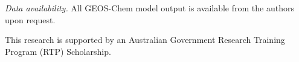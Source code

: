 \documentclass[acp, manuscript]{copernicus} %
\begin{document}
\authorcontribution{}



%
\textit{Data availability.} All GEOS-Chem model output is available from the authors upon request.

\begin{acknowledgements}
This research is supported by an Australian Government Research Training Program (RTP) Scholarship.
\end{acknowledgements}



\end{document}
